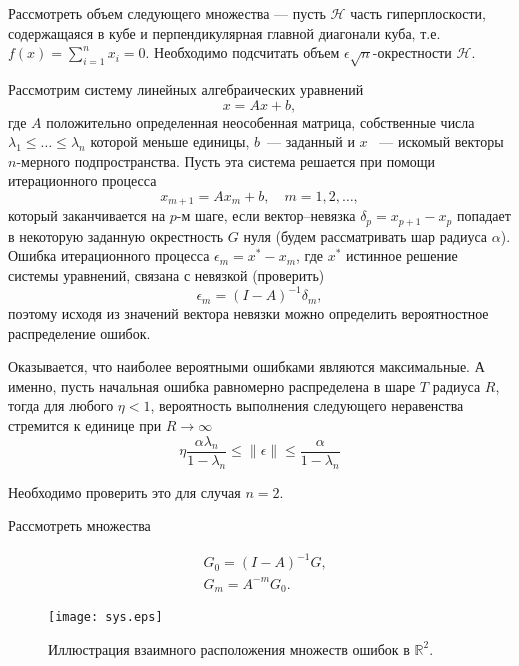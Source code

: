 \begin{remark} 
Рассмотреть объем  следующего множества ---   пусть $\mathcal{H}$ часть гиперплоскости, содержащаяся в кубе и перпендикулярная главной диагонали куба, т.е.  $f(x) =\sum_{i=1}^n x_i = 0$. Необходимо подсчитать объем $\epsilon\sqrt{n}$-окрестности $\mathcal{H}$. 
\end{remark}

\begin{problem}
Рассмотрим систему линейных алгебраических уравнений 
\begin{equation*}
x=Ax+b,
\end{equation*}
где $A$ положительно определенная неособенная матрица, собственные числа $\lambda_1\leq\dots\leq\lambda_n$ которой меньше единицы, $b$~--- заданный и  $x$ ~--- искомый векторы $n$-мерного подпространства. Пусть эта система решается при помощи итерационного процесса 
\begin{equation*}
x_{m+1}= Ax_{m}+b,\quad m=1,2,\dots,
\end{equation*}
 который заканчивается на $p$-м шаге, если вектор--невязка $\delta_p = x_{p+1}-x_{p}$ попадает в некоторую заданную окрестность $G$ нуля (будем рассматривать шар радиуса $\alpha$). 
Ошибка итерационного процесса $\epsilon_m = x^{*} - x_m$, где  $x^{*}$ истинное решение системы уравнений, связана с невязкой  (проверить)
 \begin{equation*}
\epsilon_m = (I-A)^{-1}\delta_m,
\end{equation*}
поэтому  исходя из значений вектора невязки можно определить вероятностное распределение  ошибок. 

Оказывается, что наиболее вероятными ошибками являются максимальные.
А именно, пусть начальная ошибка равномерно распределена в шаре $T$ радиуса $R$, тогда для любого $\eta<1$, вероятность выполнения следующего неравенства стремится к единице при $R\to\infty$
\begin{equation*}
\eta \frac{\alpha \lambda_n}{1-\lambda_n}\leq \|\epsilon\| \leq \frac{\alpha}{1-\lambda_n}
\end{equation*} 

Необходимо проверить это для случая $n=2$.

\end{problem}
\begin{remark}
Рассмотреть множества

\begin{equation*}
\begin{split}
&G_0 = (I-A)^{-1}G,\\
&G_m = A^{-m}G_0.
\end{split}
\end{equation*} 
\end{remark}
\begin{figure}[h]
\begin{center}
\texttt{[image: sys.eps]}
\end{center}
\caption{Иллюстрация взаимного расположения множеств ошибок в $\mathbb{R}^2$.}
\end{figure}



